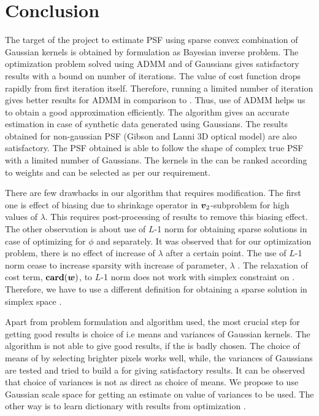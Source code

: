 %

\chapter{Conclusion}
The target of the project to estimate PSF using sparse convex combination of Gaussian kernels is obtained by formulation as Bayesian inverse problem. The optimization problem solved using ADMM and \dic of Gaussians gives satisfactory results with a bound on number of iterations. The value of cost function drops rapidly from first iteration itself. Therefore, running a limited number of iteration gives better results for ADMM in comparison to \cma. Thus, use of ADMM helps us to obtain a good approximation efficiently. The algorithm gives an accurate estimation in case of synthetic data generated using Gaussians. The results obtained for non-gaussian PSF (Gibson and Lanni 3D optical model) are also satisfactory. The PSF obtained is able to follow the shape of complex true PSF with a limited number of Gaussians. The kernels in the \dic can be ranked according to weights and can be selected as per our requirement.  \par
There are few drawbacks in our algorithm that requires modification. The first one is effect of biasing due to shrinkage operator in $\boldsymbol{v}_2$-subproblem for high values of $\lambda$. This requires post-processing of results to remove this biasing effect. The other observation is about use of $L$-1 norm for obtaining sparse solutions in case of optimizing for $\phi$ and \w separately. It was observed that for our optimization problem, there is no effect of increase of $\lambda$ after a certain point. The use of $L$-1 norm cease to increase sparsity with increase of parameter, $\lambda$ . The relaxation of cost term, $\mathbf{card}(\boldsymbol{w})$, to $L$-1 norm does not work with simplex constraint on \w. Therefore, we have to use a different definition for obtaining a sparse solution in simplex space \cite{bach}.\par
Apart from problem formulation and algorithm used, the most crucial step for getting good results is choice of \dic i.e means and variances of Gaussian kernels. The algorithm is not able to give good results, if the \dic is badly chosen. The choice of means of \dic by selecting brighter pixels works well, while, the variances of Gaussians are tested and tried to build a \dic for giving satisfactory results. It can be observed that choice of variances is not as direct as choice of means. We propose to use Gaussian scale space for getting an estimate on value of variances to be used. The other way is to learn dictionary with results from optimization \cite{sls}.\par
